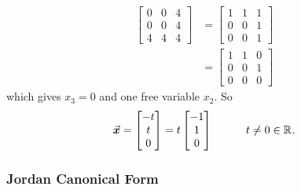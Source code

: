 \documentclass[MathsNotesBase.tex]{subfiles}
\begin{document}
{\begin{exe}
{				\begin{align*}
				\begin{bmatrix}
				0 & 0 & 4\\
				0 & 0 & 4\\
				4 & 4 & 4
				\end{bmatrix} &=
				\begin{bmatrix}
				1 & 1 & 1\\
				0 & 0 & 1\\
				0 & 0 & 1
				\end{bmatrix} \\
				&= \begin{bmatrix}
				1 & 1 & 0\\
				0 & 0 & 1\\
				0 & 0 & 0
				\end{bmatrix}
				\end{align*}
				which gives ${ x_3 = 0 }$ and one free variable $x_2$. So
				\[ \vec{\bm{x}} = \begin{bmatrix}-t \\ t \\ 0\end{bmatrix} = t\begin{bmatrix}-1 \\ 1 \\ 0\end{bmatrix} \hspace{30pt} t \neq 0 \in \mathbb{R}^{}. \]
			}
		\end{exe}
		
		
		\bigskip\bigskip
		\subsubsection{Jordan Canonical Form}
	}



\end{document}
